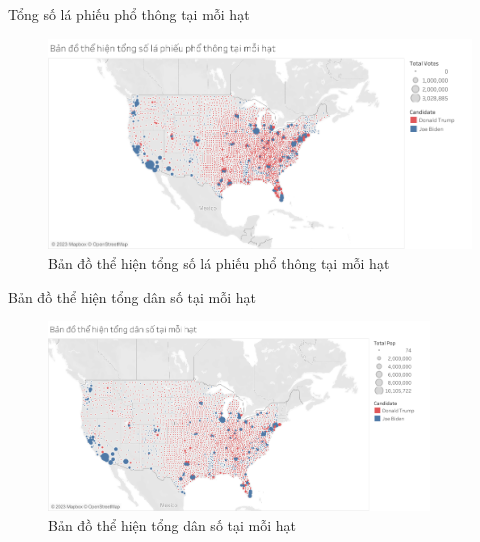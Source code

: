 \documentclass[10pt]{beamer}
\theoremstyle{remark}
\theoremstyle{definition}
\begin{document}
\begin{frame}{Tổng số lá phiếu phổ thông tại mỗi hạt}
	\begin{figure}[h!]
        \centering
        \includegraphics[width=\textwidth]{County_Total_Vote_Circle.png}
        \caption{Bản đồ thể hiện tổng số lá phiếu phổ thông tại mỗi hạt}
    \end{figure}
\end{frame}

\begin{frame}{Bản đồ thể hiện tổng dân số tại mỗi hạt}
	\begin{figure}[h!]
        \centering
        \includegraphics[width=0.9\textwidth]{figures/County_Total_Population_Circle.png}
        \caption{Bản đồ thể hiện tổng dân số tại mỗi hạt}
    \end{figure}
\end{frame}
\end{document}
